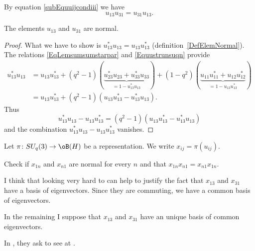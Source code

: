 By equation \eqref{subEquuijcondiii} we have
\begin{equation}
	u_{13}u_{31}=u_{31}u_{13}.
\end{equation}

\begin{lemma}
	The elements \( u_{13}\) and \( u_{31}\) are normal.
\end{lemma}

\begin{proof}
	What we have to show is \( u_{13}^*u_{13}=u_{13}u_{13}^*\) (definition~\ref{DefElemNormal}). The relations \eqref{EqLemsumsumstarpar} and \eqref{Equustrunsuqn} provide
	\begin{subequations}
		\begin{align}
			u_{13}^*u_{13} & =u_{13}u_{13}^*+(q^2-1)(\underbrace{u_{23}^*u_{23}+u_{33}^*u_{33}}_{=1-u_{13}^*u_{13}})+(1-q^2)(\underbrace{u_{11}u_{11}^*+u_{12}u_{12}^*}_{=1-u_{13}u_{13}^*}) \\
			               & =u_{13}u_{13}^*+(q^2-1)(u_{13}u_{13}^*-u_{13}^*u_{13}).
		\end{align}
	\end{subequations}
	Thus
	\begin{equation}
		u_{13}^*u_{13}-u_{13}u_{13}^*=(q^2-1)(u_{13}u_{13}^*-u_{13}^*u_{13})
	\end{equation}
	and the combination \( u_{13}^*u_{13}-u_{13}u_{13}^*\) vanishes.
\end{proof}

Let \( \pi\colon SU_q(3)\to \oB(H)\) be a representation. We write \( x_{ij}=\pi(u_{ij})\).

\begin{probleme}
	Check if \( x_{1n}\) and \( x_{n1}\) are normal for every \( n\) and that \( x_{1n}x_{n1}=x_{n1}x_{1n}\).
\end{probleme}

\begin{probleme}
	I think that looking very hard to \cite{AndrewGreen} can help to justify the fact that \( x_{13}\) and \( x_{31}\) have a basis of eigenvectors. Since they are commuting, we have a common basis of eigenvectors.

	In the remaining I suppose that \( x_{13}\) and \( x_{31}\) have an unique basis of common eigenvectors.

	In \cite{Bragiel}, they ask to see at \cite{PuszWoronowicz}.
\end{probleme}

